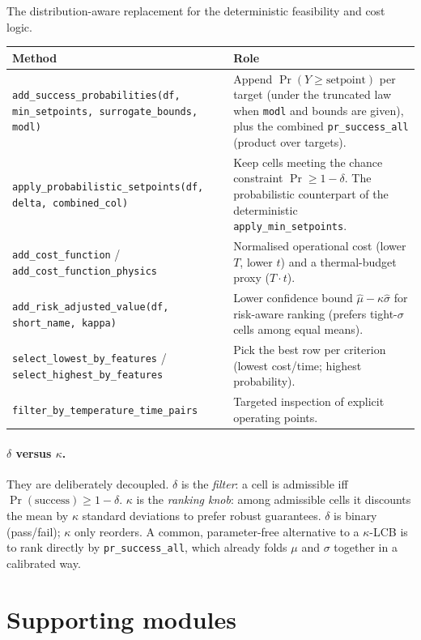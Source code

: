 \documentclass[11pt,a4paper]{article}
\newcommand{\code}[1]{\texttt{\small #1}}
\begin{document}
The distribution-aware replacement for the deterministic feasibility and cost
logic.

\begin{longtable}{@{}p{}p{}@{}}
\toprule
\textbf{Method} & \textbf{Role} \\
\midrule
\endhead
\code{add\_success\_probabilities(df, min\_setpoints, surrogate\_bounds, modl)} &
  Append $\Pr(Y\ge\text{setpoint})$ per target (under the truncated law when
  \code{modl} and bounds are given), plus the combined \code{pr\_success\_all}
  (product over targets). \\
\code{apply\_probabilistic\_setpoints(df, delta, combined\_col)} &
  Keep cells meeting the chance constraint $\Pr \ge 1-\delta$. The probabilistic
  counterpart of the deterministic \code{apply\_min\_setpoints}. \\
\code{add\_cost\_function} / \code{add\_cost\_function\_physics} &
  Normalised operational cost (lower $T$, lower $t$) and a thermal-budget proxy
  ($T\!\cdot\!t$). \\
\code{add\_risk\_adjusted\_value(df, short\_name, kappa)} &
  Lower confidence bound $\hat\mu-\kappa\hat\sigma$ for risk-aware ranking
  (prefers tight-$\sigma$ cells among equal means). \\
\code{select\_lowest\_by\_features} / \code{select\_highest\_by\_features} &
  Pick the best row per criterion (lowest cost/time; highest probability). \\
\code{filter\_by\_temperature\_time\_pairs} &
  Targeted inspection of explicit operating points. \\
\bottomrule
\end{longtable}

\paragraph{$\delta$ versus $\kappa$.} They are deliberately decoupled. $\delta$
is the \emph{filter}: a cell is admissible iff $\Pr(\text{success})\ge 1-\delta$.
$\kappa$ is the \emph{ranking knob}: among admissible cells it discounts the
mean by $\kappa$ standard deviations to prefer robust guarantees. $\delta$ is
binary (pass/fail); $\kappa$ only reorders. A common, parameter-free alternative
to a $\kappa$-LCB is to rank directly by \code{pr\_success\_all}, which already
folds $\mu$ and $\sigma$ together in a calibrated way.

\section{Supporting modules}
\end{document}
